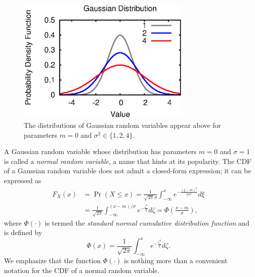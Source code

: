 \begin{figure}[ht]
\begin{center}
\includegraphics[width=8.5cm]{Figures/8chapter/gaussian_pdf}
\end{center}
\caption{The distributions of Gaussian random variables appear above for parameters $m = 0$ and $\sigma^2 \in \{ 1, 2, 4 \}$.}
\end{figure}

A Gaussian random variable whose distribution has parameters $m = 0$ and $\sigma = 1$ is called a \emph{normal random variable}, a name that hints at its popularity. 
The CDF of a Gaussian random variable does not admit a closed-form expression; it can be expressed as
\begin{equation*}
\begin{split}
F_X (x) &= \Pr (X \leq x)
= \frac{1}{\sqrt{2 \pi} \sigma}
\int_{- \infty}^{x} e^{- \frac{(\xi - m)^2}{2 \sigma^2}} d\xi \\
&= \frac{1}{\sqrt{2 \pi}}
\int_{- \infty}^{(x - m)/\sigma} e^{- \frac{\zeta^2}{2}} d\zeta
= \Phi \left( \frac{x - m}{\sigma} \right),
\end{split}
\end{equation*}
where $\Phi (\cdot)$ is termed the \emph{standard normal cumulative distribution function} and is defined by
\begin{equation*}
\Phi (x) = 
\frac{1}{\sqrt{2 \pi}} \int_{-\infty}^x e^{-\frac{\zeta^2}{2}} d\zeta .
\end{equation*}
We emphasize that the function $\Phi (\cdot)$ is nothing more than a convenient notation for the CDF of a normal random variable.

